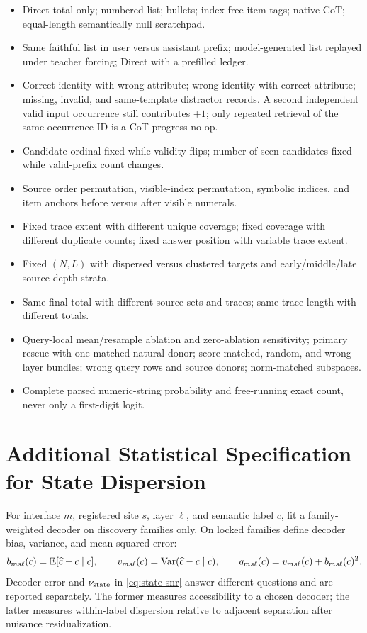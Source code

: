 \begin{itemize}
  \item Direct total-only; numbered list; bullets; index-free item tags; native CoT; equal-length semantically null scratchpad.
  \item Same faithful list in user versus assistant prefix; model-generated list replayed under teacher forcing; Direct with a prefilled ledger.
  \item Correct identity with wrong attribute; wrong identity with correct
  attribute; missing, invalid, and same-template distractor records. A second
  independent valid input occurrence still contributes \(+1\); only repeated
  retrieval of the same occurrence ID is a CoT progress no-op.
  \item Candidate ordinal fixed while validity flips; number of seen candidates fixed while valid-prefix count changes.
  \item Source order permutation, visible-index permutation, symbolic indices, and item anchors before versus after visible numerals.
  \item Fixed trace extent with different unique coverage; fixed coverage with different duplicate counts; fixed answer position with variable trace extent.
  \item Fixed \((N,L)\) with dispersed versus clustered targets and early/middle/late source-depth strata.
  \item Same final total with different source sets and traces; same trace length with different totals.
  \item Query-local mean/resample ablation and zero-ablation sensitivity;
  primary rescue with one matched natural donor; score-matched, random, and
  wrong-layer bundles; wrong query rows and source donors; norm-matched
  subspaces.
  \item Complete parsed numeric-string probability and free-running exact count, never only a first-digit logit.
\end{itemize}

\section{Additional Statistical Specification for State Dispersion}
\label{app:noise}

For interface \(m\), registered site \(s\), layer \(\ell\), and semantic label
\(c\), fit a family-weighted decoder on discovery families only. On locked
families define decoder bias, variance, and mean squared error:
\begin{equation}
b_{ms\ell}(c)=\mathbb{E}[\widehat c-c\mid c],
\qquad
v_{ms\ell}(c)=\operatorname{Var}(\widehat c-c\mid c),
\qquad
q_{ms\ell}(c)=v_{ms\ell}(c)+b_{ms\ell}(c)^2.
\label{eq:decoder-bias-var}
\end{equation}
Decoder error and \(\nu_{\rm state}\) in \cref{eq:state-snr} answer different
questions and are reported separately. The former measures accessibility to a
chosen decoder; the latter measures within-label dispersion relative to
adjacent separation after nuisance residualization.

